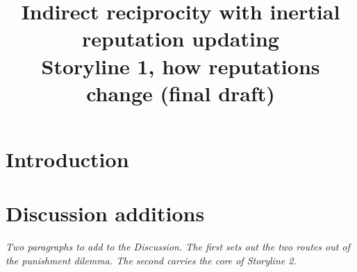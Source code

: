 \documentclass[11pt]{article}
\title{\large Indirect reciprocity with inertial reputation updating\\[0.3em]
\normalsize Storyline 1, how reputations change (final draft)}
\date{}
\begin{document}
\maketitle

\section*{Introduction}











\section*{Discussion additions}
\textit{Two paragraphs to add to the Discussion. The first sets out the two routes out of the punishment dilemma. The second carries the core of Storyline 2.}







\end{document}
